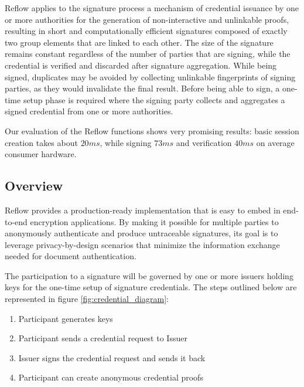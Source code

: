 \documentclass[twocolumn]{article}
\begin{document}
Reflow applies to the signature process a mechanism of credential
issuance by one or more authorities for the generation of
non-interactive and unlinkable proofs, resulting in short and
computationally efficient signatures composed of exactly two group
elements that are linked to each other. The size of the signature
remains constant regardless of the number of parties that are signing,
while the credential is verified and discarded after signature
aggregation. While being signed, duplicates may be avoided by collecting
unlinkable fingerprints of signing parties, as they would invalidate the
final result. Before being able to sign, a one-time setup phase is
required where the signing party collects and aggregates a signed
credential from one or more authorities.

Our evaluation of the Reflow functions shows very promising
results: basic session creation takes about $20ms$, while signing $73ms$ and
verification $40ms$ on average consumer hardware.

\subsection*{Overview}

Reflow provides a production-ready implementation that is easy to embed in end-to-end encryption applications. By making it possible for multiple parties to anonymously authenticate and produce untraceable signatures, its goal is to leverage privacy-by-design scenarios that minimize the information exchange needed for document authentication.

The participation to a signature will be governed by one or more issuers holding keys for the one-time setup of signature credentials. The steps outlined below are represented in figure \ref{fig:credential_diagram}:

\begin{enumerate} %
  \item Participant generates keys
  \item Participant sends a credential request to Issuer
  \item Issuer signs the credential request and sends it back
  \item Participant can create anonymous credential proofs
\end{enumerate}

\end{document}
